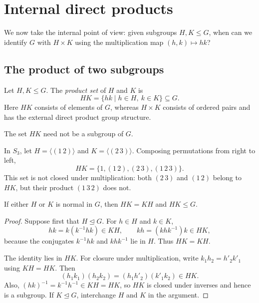\documentclass[reqno,11pt]{amsart}
\begin{document}
\section{Internal direct products}

We now take the internal
point of view: given subgroups $H,K\leq G$, when can we identify $G$
with $H\times K$ using the multiplication map $(h,k)\mapsto hk$?

\subsection{The product of two subgroups}

Let $H,K\leq G$. The \emph{product set} of $H$ and $K$ is
\[
  HK=\{hk\mid h\in H,\ k\in K\}\subseteq G.
\]
Here $HK$ consists of elements of $G$, whereas $H\times K$ consists
of ordered pairs and has the external direct product group structure.

\begin{warningbox}
The set $HK$ need not be a subgroup of $G$.
\end{warningbox}

\begin{example}
In $S_3$, let $H=\langle(1\,2)\rangle$ and
$K=\langle(2\,3)\rangle$. Composing permutations from right to left,
\[
  HK=\{1,(1\,2),(2\,3),(1\,2\,3)\}.
\]
This set is not closed under multiplication: both $(2\,3)$ and
$(1\,2)$ belong to $HK$, but their product $(1\,3\,2)$ does not.
\end{example}


\begin{lemma}\label{lem:product-subgroup}
If either $H$ or $K$ is normal in $G$, then $HK=KH$ and $HK\leq G$.
\end{lemma}
\begin{proof}
Suppose first that $H\trianglelefteq G$. For $h\in H$ and $k\in K$,
\[
  hk=k(k^{-1}hk)\in KH,\qquad
  kh=(khk^{-1})k\in HK,
\]
because the conjugates $k^{-1}hk$ and $khk^{-1}$ lie in $H$.
Thus $HK=KH$.

The identity lies in $HK$. For closure under multiplication, write
$k_1h_2=h'_2k'_1$ using $KH=HK$. Then
\[
  (h_1k_1)(h_2k_2)=(h_1h'_2)(k'_1k_2)\in HK.
\]
Also, $(hk)^{-1}=k^{-1}h^{-1}\in KH=HK$, so $HK$ is closed under
inverses and hence is a subgroup. If $K\trianglelefteq G$, interchange
$H$ and $K$ in the argument.
\end{proof}
\end{document}
